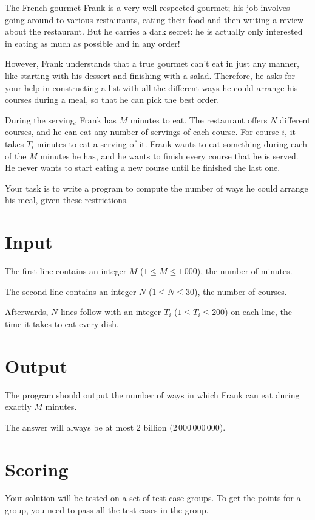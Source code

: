 The French gourmet Frank is a very well-respected gourmet; his job involves going around to various restaurants, eating their food and then writing a review about the restaurant.
But he carries a dark secret: he is actually only interested in eating as much as possible and in any order!

However, Frank understands that a true gourmet can't eat in just any manner, like starting with his dessert and finishing with a salad.
Therefore, he asks for your help in constructing a list with all the different ways he could arrange his courses during a meal, so that he can pick the best order.

During the serving, Frank has $M$ minutes to eat.
The restaurant offers $N$ different courses, and he can eat any number of servings of each course.
For course $i$, it takes $T_i$ minutes to eat a serving of it.
Frank wants to eat something during each of the $M$ minutes he has, and he wants to finish every course that he is served.
He never wants to start eating a new course until he finished the last one.

Your task is to write a program to compute the number of ways he could arrange his meal, given these restrictions.

\section*{Input}
The first line contains an integer $M$ ($1 \le M \le 1\,000$), the number of minutes. 

The second line contains an integer $N$ ($1 \le N \le 30$), the number of courses.

Afterwards, $N$ lines follow with an integer $T_i$ ($1 \le T_i \le 200$) on each line, the time it takes to eat every dish.

\section*{Output}
The program should output the number of ways in which Frank can eat during exactly $M$ minutes.

The answer will always be at most 2 billion ($2\,000\,000\,000$).

\section*{Scoring}
Your solution will be tested on a set of test case groups.
To get the points for a group, you need to pass all the test cases in the group.

